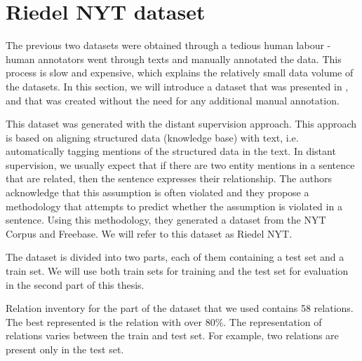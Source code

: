 



\section{Riedel NYT dataset}
The previous two datasets were obtained through a tedious human labour - human annotators went through texts and manually annotated the data. This process is slow and expensive, which explains the relatively small data volume of the datasets. In this section, we will introduce a dataset that was presented in \cite{nytdistant}, and that was created without the need for any additional manual annotation.


This dataset was generated with the distant supervision approach. This approach is based on aligning structured data (knowledge base) with text, i.e. automatically tagging mentions of the structured data in the text. In distant supervision, we usually expect that if there are two entity mentions in a sentence that are related, then the sentence expresses their relationship. The authors acknowledge that this assumption is often violated and they propose a methodology that attempts to predict whether the assumption is violated in a sentence. Using this methodology, they generated a dataset from the NYT Corpus  and Freebase. We will refer to this dataset as Riedel NYT.

The dataset is divided into two parts, each of them containing a test set and a train set. We will use both train sets for training and the  test set for evaluation in the second part of this thesis.


Relation inventory for the part of the dataset that we used contains 58 relations. The best represented is the  relation with over 80\%. The representation of relations varies between the train and test set. For example, two relations are present only in the test set. 





